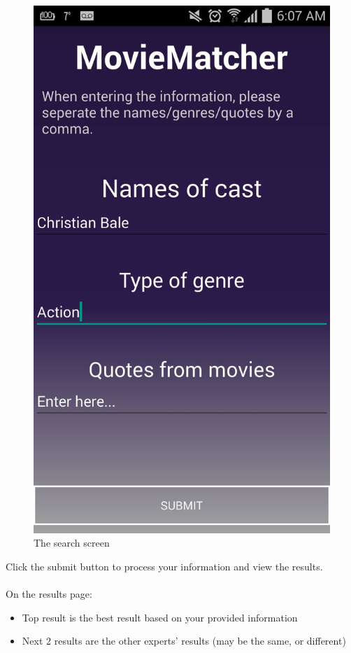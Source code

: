 \documentclass[11pt,a4paper]{article}
\begin{document}
\begin{figure}[H]
\centering
\includegraphics[scale=.08]{screen1.jpg}
\caption{The search screen}
\end{figure}

Click the submit button to process your information and view the results.\\
\\

On the results page:
\begin{itemize}
\item[] Top result is the best result based on your provided information
\item[] Next 2 results are the other experts' results (may be the same, or different)
\end{itemize}
\end{document}
